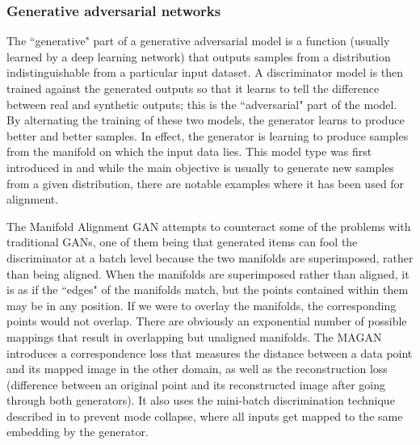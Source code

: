 \subsubsection{Generative adversarial networks}

The ``generative" part of a generative adversarial model is a function (usually learned by a deep learning network) that outputs samples from a distribution indistinguishable from a particular input dataset. A discriminator model is then trained against the generated outputs so that it learns to tell the difference between real and synthetic outputs; this is the ``adversarial" part of the model. By alternating the training of these two models, the generator learns to produce better and better samples. In effect, the generator is learning to produce samples from the manifold on which the input data lies. This model type was first introduced in \cite{GAN} and while the main objective is usually to generate new samples from a given distribution, there are notable examples where it has been used for alignment.

The Manifold Alignment GAN \cite{magan} attempts to counteract some of the problems with traditional GANs, one of them being that generated items can fool the discriminator at a batch level because the two manifolds are superimposed, rather than being aligned. When the manifolds are superimposed rather than aligned, it is as if the ``edges" of the manifolds match, but the points contained within them may be in any position. If we were to overlay the manifolds, the corresponding points would not overlap. There are obviously an exponential number of possible mappings that result in overlapping but unaligned manifolds. The MAGAN introduces a correspondence loss that measures the distance between a data point and its mapped image in the other domain, as well as the reconstruction loss (difference between an original point and its reconstructed image after going through both generators). It also uses the mini-batch discrimination technique described in \cite{ImprovedTechniquesTrainingGANS} to prevent mode collapse, where all inputs get mapped to the same embedding by the generator.

